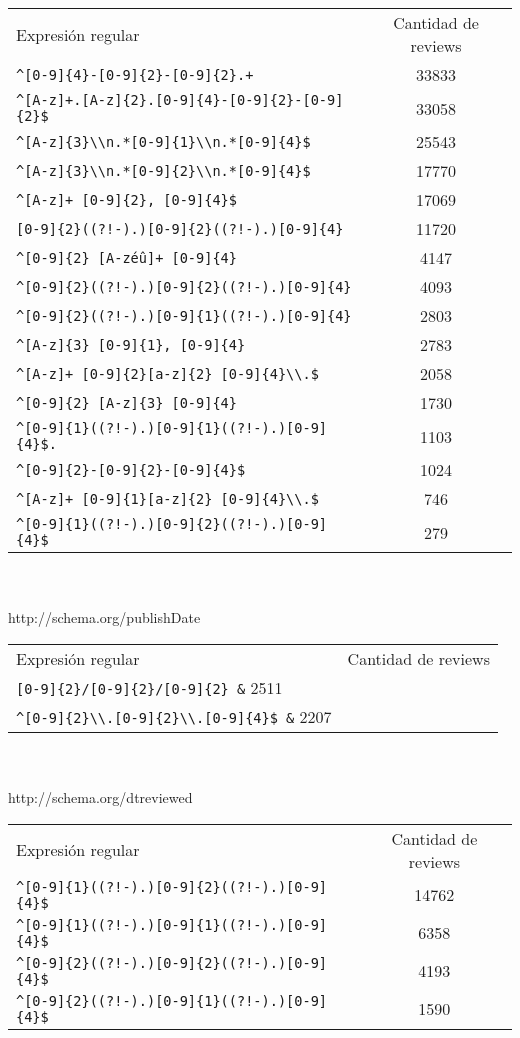 \begin{tabular}{| l | c |}
Expresión regular & Cantidad de reviews\\
\verb|^[0-9]{4}-[0-9]{2}-[0-9]{2}.+| & 33833\\
\verb|^[A-z]+.[A-z]{2}.[0-9]{4}-[0-9]{2}-[0-9]{2}$| & 33058\\
\verb|^[A-z]{3}\\n.*[0-9]{1}\\n.*[0-9]{4}$| & 25543\\
\verb|^[A-z]{3}\\n.*[0-9]{2}\\n.*[0-9]{4}$| & 17770\\
\verb|^[A-z]+ [0-9]{2}, [0-9]{4}$| & 17069\\
\verb|[0-9]{2}((?!-).)[0-9]{2}((?!-).)[0-9]{4}| & 11720\\
\verb|^[0-9]{2} [A-zéû]+ [0-9]{4}| & 4147\\
\verb|^[0-9]{2}((?!-).)[0-9]{2}((?!-).)[0-9]{4}| & 4093\\
\verb|^[0-9]{2}((?!-).)[0-9]{1}((?!-).)[0-9]{4}| & 2803\\
\verb|^[A-z]{3} [0-9]{1}, [0-9]{4}| & 2783\\
\verb|^[A-z]+ [0-9]{2}[a-z]{2} [0-9]{4}\\.$| & 2058\\
\verb|^[0-9]{2} [A-z]{3} [0-9]{4}| & 1730\\
\verb|^[0-9]{1}((?!-).)[0-9]{1}((?!-).)[0-9]{4}$.| & 1103\\
\verb|^[0-9]{2}-[0-9]{2}-[0-9]{4}$| & 1024\\
\verb|^[A-z]+ [0-9]{1}[a-z]{2} [0-9]{4}\\.$| & 746\\
\verb|^[0-9]{1}((?!-).)[0-9]{2}((?!-).)[0-9]{4}$| & 279\\
\end{tabular}\\
\\
http://schema.org/publishDate\\
\begin{tabular}{| l | c |}
Expresión regular & Cantidad de reviews\\
\verb|[0-9]{2}/[0-9]{2}/[0-9]{2} &| 2511\\
\verb|^[0-9]{2}\\.[0-9]{2}\\.[0-9]{4}$ &| 2207
\end{tabular}\\
\\
http://schema.org/dtreviewed\\
\begin{tabular}{| l | c |}
Expresión regular & Cantidad de reviews\\
\verb|^[0-9]{1}((?!-).)[0-9]{2}((?!-).)[0-9]{4}$| & 14762\\
\verb|^[0-9]{1}((?!-).)[0-9]{1}((?!-).)[0-9]{4}$| & 6358\\
\verb|^[0-9]{2}((?!-).)[0-9]{2}((?!-).)[0-9]{4}$| & 4193\\
\verb|^[0-9]{2}((?!-).)[0-9]{1}((?!-).)[0-9]{4}$| & 1590
\end{tabular}

